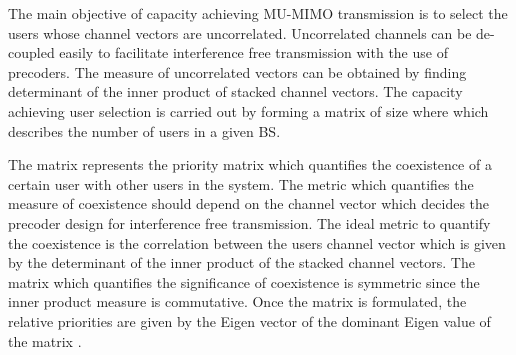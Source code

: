 
The main objective of capacity achieving MU-MIMO transmission is to select the users whose channel vectors are uncorrelated. Uncorrelated channels can be de-coupled easily to facilitate interference free transmission with the use of precoders. The measure of uncorrelated vectors can be obtained by finding determinant of the inner product of stacked  channel vectors. The capacity achieving user selection is carried out by forming a matrix  of size  where  which describes the number of users in a given BS.

The matrix  represents the priority matrix which quantifies the coexistence of a certain user with other users in the system. The metric which quantifies the measure of coexistence should depend on the channel vector which decides the precoder design for interference free transmission. The ideal metric to quantify the coexistence is the correlation between the users channel vector which is given by the determinant of the inner product of the stacked channel vectors. The matrix  which quantifies the significance of coexistence is symmetric since the inner product measure is commutative. Once the matrix  is formulated, the relative priorities are given by the Eigen vector of the dominant Eigen value of the matrix  \cite{saaty2008decision}.

